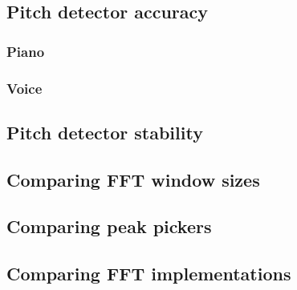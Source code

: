 \subsection{Pitch detector accuracy}
\subsubsection{Piano}
\subsubsection{Voice}
\subsection{Pitch detector stability}
\subsection{Comparing FFT window sizes}
\subsection{Comparing peak pickers}
\subsection{Comparing FFT implementations}